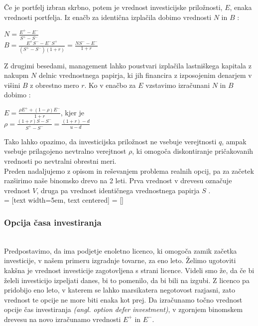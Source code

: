 \documentclass[12pt, a4paper]{amsart}
\theoremstyle{definition} %
\theoremstyle{plain} %
\begin{document}
Če je portfelj izbran skrbno, potem je vrednost investicijske priložnosti, $E$, enaka vrednosti portfelja. Iz enačb za identična izplačila dobimo vrednosti $N$ in $B$ \cite[str. 156]{Trigeorgis}:
\begin{center}
$N = \tfrac{E^+ - E^-}{S^+ - S^-}$\\[0,5 cm]
$B = \tfrac{E^+S^- - E^-S^+}{(S^+ - S^-)(1+r)} = \tfrac{NS^- - E^-}{1+r}$\\
\end{center}
Z drugimi besedami, management lahko poustvari izplačila lastniškega kapitala z nakupm $N$ delnic vrednostnega papirja, ki jih financira z izposojenim denarjem v višini $B$ z obrestno mero $r$. Ko v enačbo za $E$ vzstavimo izračunani $N$ in $B$ dobimo \cite[str. 156, 157]{Trigeorgis}:
\begin{center}
$E = \tfrac{\rho E^+ + (1-\rho)E^-}{1+r}$, kjer je \\[0,5 cm]
$\rho = \tfrac{(1+r)S - S^-}{S^+ - S^-} = \tfrac{(1+r)-d}{u-d}$
\end{center}
Tako lahko opazimo, da investicijska priložnost ne vsebuje verejtnosti $q$, ampak vsebuje prilagojeno nevtralno verejtnost $\rho$, ki omogoča diskontiranje pričakovanih vrednosti po nevtralni obrestni meri. \\

Preden nadaljujemo z opisom in reševanjem problema realnih opcij, pa za začetek razširimo naše binomsko drevo na 2 leti. Prva vrednost v drevesu označuje vrednost $V$, druga pa vrednost identičnega vrednostnega papirja $S$ \cite[str. 158]{Trigeorgis}. \\[0,5 cm]

 = [text width=5em, text centered]
 = []

\subsubsection{Opcija časa investiranja}
\cite[str. 158, 161]{Trigeorgis}\\
Predpostavimo, da ima podjetje enoletno licenco, ki omogoča zamik začetka investicije, v našem primeru izgradnje tovarne, za eno leto. Želimo ugotoviti kakšna je vrednost investicije zagotovljena s strani licence. Videli smo že, da če bi želeli investicijo izpeljati danes, bi to pomenilo, da bi bili na izgubi. Z licenco pa pridobijo eno leto, v katerem se lahko marsikatera negotovost razjasni, zato vrednost te opcije ne more biti enaka kot prej. Da izračunamo točno vrednost opcije čas investiranja \textit{(angl. option defer investment)}, v zgornjem binomskem drevesu na novo izračunamo vrednosti $E^+$ in $E^-$. 
\end{document}
